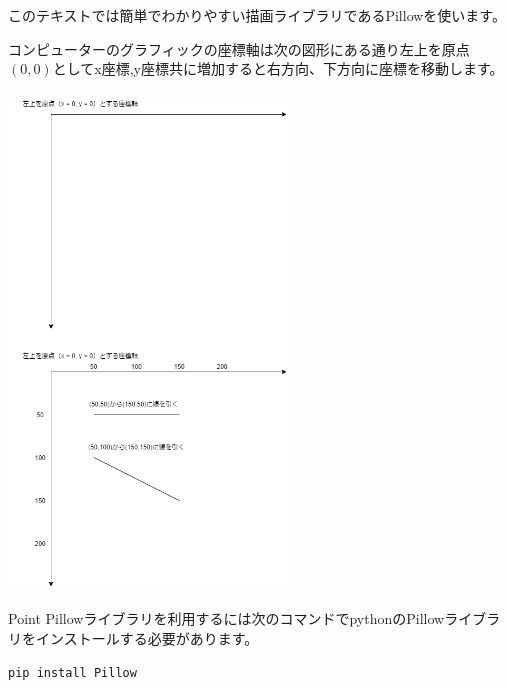 \documentclass[11pt,a4paper,dvipdfmx,titlepage]{jsreport}
\begin{document}
このテキストでは簡単でわかりやすい描画ライブラリであるPillowを使います。

コンピューターのグラフィックの座標軸は次の図形にある通り左上を原点$(0,0)$としてx座標,y座標共に増加すると右方向、下方向に座標を移動します。
\\
\\


\includegraphics[width=7.5cm]{images/drawimage1.png}

\begin{hipoint}{Point}
Pillowライブラリを利用するには次のコマンドでpythonのPillowライブラリをインストールする必要があります。
\begin{verbatim}
pip install Pillow
\end{verbatim}
\end{hipoint}
\end{document}
